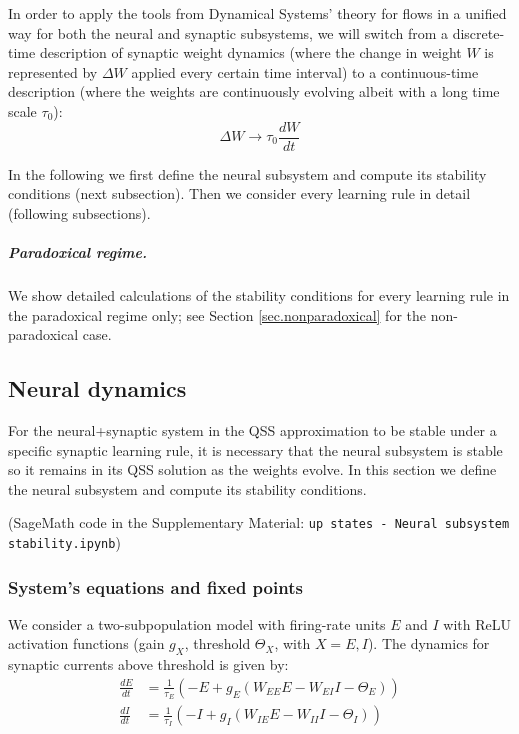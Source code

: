 \documentclass[
twocolumn,
]{article}
\newcommand{\EE}{\mathit{EE}}
\newcommand{\EI}{\mathit{EI}}
\newcommand{\IE}{\mathit{IE}}
\newcommand{\II}{\mathit{II}}
\begin{document}
In order to apply the tools from Dynamical Systems' theory for flows in a unified way for both the neural and synaptic subsystems, we will switch from a discrete-time description of synaptic weight dynamics (where the change in weight $W$ is represented by $\Delta W$ applied every certain time interval) to a continuous-time description (where the weights are continuously evolving albeit with a long time scale $\tau_0$):
\begin{displaymath}
\Delta W \rightarrow \tau_0 \frac{dW}{dt}
\end{displaymath}

In the following we first define the neural subsystem and compute its stability conditions (next subsection). Then we consider every learning rule in detail (following subsections).

\subparagraph{Paradoxical regime.} We show detailed calculations of the stability conditions for every learning rule in the paradoxical regime only; see Section \ref{sec.nonparadoxical} for the non-paradoxical case.



\subsection{Neural dynamics}

For the neural+synaptic system in the QSS approximation to be stable under a specific synaptic learning rule, it is necessary that the neural subsystem is stable so it remains in its QSS solution as the weights evolve. In this section we define the neural subsystem and compute its stability conditions.

(SageMath code in the Supplementary Material: {\tt up states - Neural subsystem stability.ipynb})


\subsubsection{System's equations and fixed points}

We consider a two-subpopulation model with firing-rate units $E$ and $I$ with ReLU activation functions (gain $g_X$, threshold $\Theta_X$, with $X=E,I$). The dynamics for synaptic currents above threshold is given by:
\begin{equation}
\begin{aligned}
\frac{dE}{dt} & = \frac{1}{\tau_E}(-E + g_E(W_{\EE}E - W_{\EI}I - \Theta_E)) \\
\frac{dI}{dt} & = \frac{1}{\tau_I}(-I + g_I(W_{\IE}E - W_{\II}I - \Theta_I))
\end{aligned}
\label{eq.neural}
\end{equation}
\end{document}
